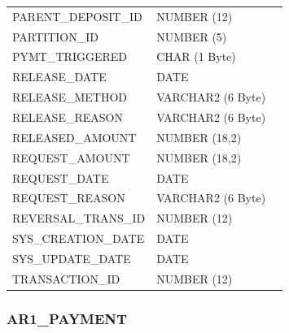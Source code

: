\documentclass[12pt,twoside]{article}
\begin{document}
\begin{longtable}{lll}
 PARENT\_DEPOSIT\_ID    &  NUMBER (12)         &                        \\
 PARTITION\_ID          &  NUMBER (5)          &                        \\
 PYMT\_TRIGGERED        &  CHAR (1 Byte)       &                        \\
 RELEASE\_DATE          &  DATE                &                        \\
 RELEASE\_METHOD        &  VARCHAR2 (6 Byte)   &                        \\
 RELEASE\_REASON        &  VARCHAR2 (6 Byte)   &                        \\
 RELEASED\_AMOUNT       &  NUMBER (18,2)       &                        \\
 REQUEST\_AMOUNT        &  NUMBER (18,2)       &                        \\
 REQUEST\_DATE          &  DATE                &                        \\
 REQUEST\_REASON        &  VARCHAR2 (6 Byte)   &                        \\
 REVERSAL\_TRANS\_ID    &  NUMBER (12)         &                        \\
 SYS\_CREATION\_DATE    &  DATE                &                        \\
 SYS\_UPDATE\_DATE      &  DATE                &                        \\
 TRANSACTION\_ID        &  NUMBER (12)         &                        \\
\hline
\end{longtable}

\normalsize
\subsubsection{AR1\_PAYMENT}
\label{sec-11-6-9}
\end{document}
